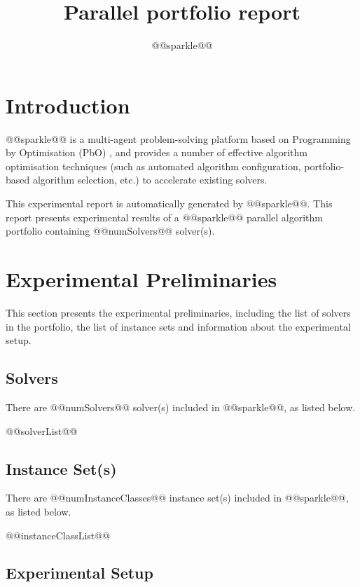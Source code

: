 \documentclass[british]{article}
\title{Parallel portfolio report}
\author{ @@sparkle@@ }
\begin{document}
\maketitle %

\section{Introduction}
\label{sec:Introduction}

@@sparkle@@ \cite{Hoos15} is a multi-agent problem-solving platform based on Programming by Optimisation (PbO) \cite{Hoos12}, and provides a number of effective algorithm optimisation techniques (such as automated algorithm configuration, portfolio-based algorithm selection, etc.) to accelerate existing solvers.

This experimental report is automatically generated by @@sparkle@@. This report presents experimental results of a @@sparkle@@ parallel algorithm portfolio containing @@numSolvers@@ solver(s).

\section{Experimental Preliminaries}
\label{sec:Experimental_Preliminaries}

This section presents the experimental preliminaries, including the list of solvers in the portfolio, the list of instance sets and information about the experimental setup.

\subsection{Solvers}
\label{sec:Solvers}
There are @@numSolvers@@ solver(s) included in @@sparkle@@, as listed below.

\begin{enumerate}[nolistsep] 
@@solverList@@
\end{enumerate}

\subsection{Instance Set(s)}
\label{sec:Instance_Sets}
There are @@numInstanceClasses@@ instance set(s) included in @@sparkle@@, as listed below.

\begin{enumerate}
@@instanceClassList@@
\end{enumerate}

\subsection{Experimental Setup}
\label{sec:Experimental_Setup}
\end{document}
